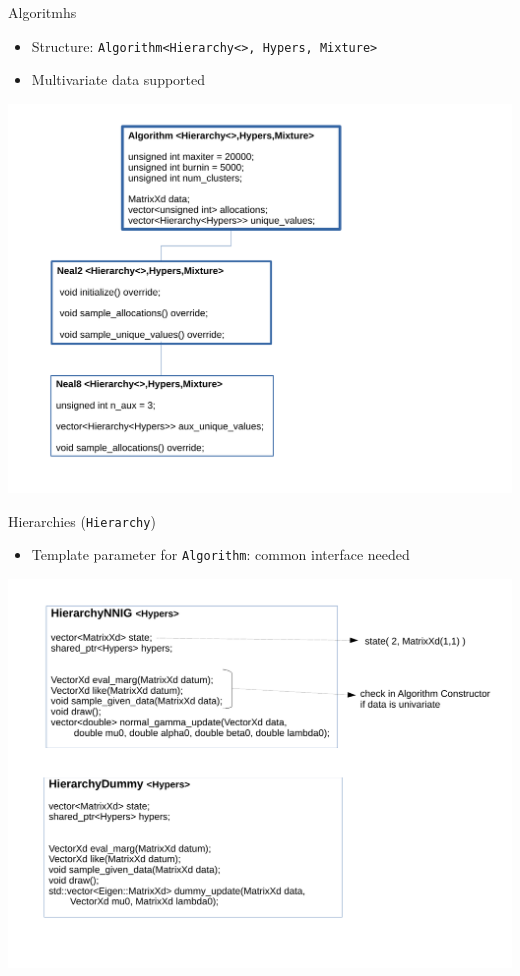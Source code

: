 

\begin{frame}[fragile]{Algoritmhs}
\begin{itemize}
	\item Structure: \texttt{Algorithm<Hierarchy<>, Hypers, Mixture>}
	\item Multivariate data supported
\end{itemize}

\begin{center}
	\includegraphics[scale=0.35]{etc/algo.pdf}
\end{center}
\end{frame}

\begin{frame}{Hierarchies (\texttt{Hierarchy})}
\begin{itemize}
	\item Template parameter for \texttt{Algorithm}: common interface needed
\end{itemize}

\begin{center}
	\includegraphics[scale=0.35]{etc/hierarchy.pdf}
\end{center}

\end{frame}

